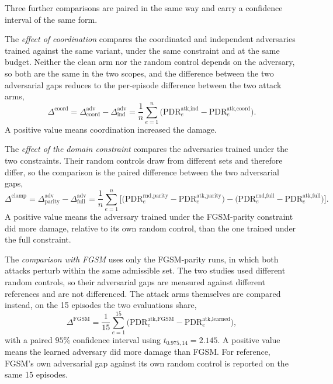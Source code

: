 Three further comparisons are paired in the same way and carry a confidence interval of
the same form.

The \emph{effect of coordination} compares the coordinated and independent adversaries
trained against the same variant, under the same constraint and at the same budget.
Neither the clean arm nor the random control depends on the adversary, so both are the
same in the two scopes, and the difference between the two adversarial gaps reduces to
the per-episode difference between the two attack arms,
\begin{equation}
  \Delta^{\text{coord}}
  = \Delta^{\text{adv}}_{\text{coord}} - \Delta^{\text{adv}}_{\text{ind}}
  = \frac{1}{n} \sum_{e=1}^{n}
    \Big( \mathrm{PDR}^{\text{atk,ind}}_{e} - \mathrm{PDR}^{\text{atk,coord}}_{e} \Big).
  \label{eq:coordination_effect}
\end{equation}
A positive value means coordination increased the damage.

The \emph{effect of the domain constraint} compares the adversaries trained under the
two constraints. Their random controls draw from different sets and therefore differ, so
the comparison is the paired difference between the two adversarial gaps,
\begin{equation}
  \Delta^{\text{clamp}}
  = \Delta^{\text{adv}}_{\text{parity}} - \Delta^{\text{adv}}_{\text{full}}
  = \frac{1}{n} \sum_{e=1}^{n}
    \Big[ \big( \mathrm{PDR}^{\text{rnd,parity}}_{e} - \mathrm{PDR}^{\text{atk,parity}}_{e} \big)
        - \big( \mathrm{PDR}^{\text{rnd,full}}_{e} - \mathrm{PDR}^{\text{atk,full}}_{e} \big) \Big].
  \label{eq:clamp_effect}
\end{equation}
A positive value means the adversary trained under the FGSM-parity constraint did more
damage, relative to its own random control, than the one trained under the full
constraint.

The \emph{comparison with FGSM} uses only the FGSM-parity runs, in which both attacks
perturb within the same admissible set. The two studies used different random controls,
so their adversarial gaps are measured against different references and are not
differenced. The attack arms themselves are compared instead, on the 15 episodes the two
evaluations share,
\begin{equation}
  \Delta^{\text{FGSM}}
  = \frac{1}{15} \sum_{e=1}^{15}
    \Big( \mathrm{PDR}^{\text{atk,FGSM}}_{e} - \mathrm{PDR}^{\text{atk,learned}}_{e} \Big),
  \label{eq:fgsm_comparison}
\end{equation}
with a paired $95\%$ confidence interval using $t_{0.975,14} = 2.145$. A positive value
means the learned adversary did more damage than FGSM. For reference, FGSM's own
adversarial gap against its own random control is reported on the same 15 episodes.

